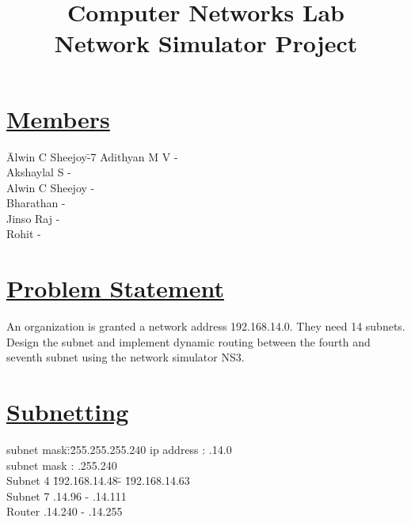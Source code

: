 \documentclass[a4paper]{report}
\title{\textbf{\Huge Computer Networks Lab\\[10pt]
Network Simulator Project}}
\date{}
\begin{document}
    \maketitle

    \section*{\underline{Members}}
    \begin{tabbing}
        \hspace{1cm}\=Alwin C Sheejoy\quad\=-\quad\=7\kill
        \>  Adithyan M V        \>  -      \\
        \>  Akshaylal S         \>  -      \\
        \>  Alwin C Sheejoy     \>  -      \\
        \>  Bharathan           \>  -     \\
        \>  Jinso Raj           \>  -     \\
        \>  Rohit               \>  -     \\
    \end{tabbing}




    \section*{\underline{Problem Statement}}
    An organization is granted a network address 192.168.14.0. They need 14
    subnets. Design the subnet and implement dynamic routing between the
    fourth and seventh subnet using the network simulator NS3.\\




    \section*{\underline{Subnetting}}
    
    \begin{ttfamily}
        \begin{tabbing}
            subnet mask\quad\=:\quad\=255.255.255.240\kill
            ip address      \>  :   .14.0\\
            subnet mask     \>  :   .255.240\\[10pt]
            Subnet 4 \quad\= 192.168.14.48\quad\= - \quad\= 192.168.14.63\\
            Subnet 7 .14.96 \> - .14.111\\
            Router .14.240 \> - .14.255\\
        \end{tabbing}
    \end{ttfamily}
\end{document}
